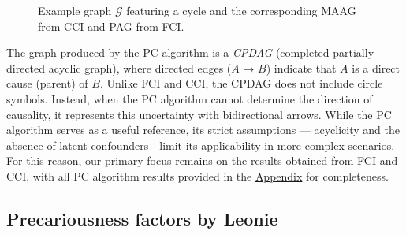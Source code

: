 \documentclass[
]{article}
\begin{document}
\begin{figure}
\begin{minipage}{0.33\linewidth}
{}


\end{minipage}%
%
\begin{minipage}{0.33\linewidth}



\end{minipage}%

\caption{\label{fig-examplegraphs}Example graph \(\mathcal{G}\)
featuring a cycle and the corresponding MAAG from CCI and PAG from FCI.}

\end{figure}%

The graph produced by the PC algorithm is a \emph{CPDAG} (completed
partially directed acyclic graph), where directed edges (\(A\) → \(B\))
indicate that \(A\) is a direct cause (parent) of \(B\). Unlike FCI and
CCI, the CPDAG does not include circle symbols. Instead, when the PC
algorithm cannot determine the direction of causality, it represents
this uncertainty with bidirectional arrows. While the PC algorithm
serves as a useful reference, its strict assumptions --- acyclicity and
the absence of latent confounders---limit its applicability in more
complex scenarios. For this reason, our primary focus remains on the
results obtained from FCI and CCI, with all PC algorithm results
provided in the \hyperref[sec-appendix]{Appendix} for completeness.

\subsection{Precariousness factors by
Leonie}\label{precariousness-factors-by-leonie}
\end{document}
